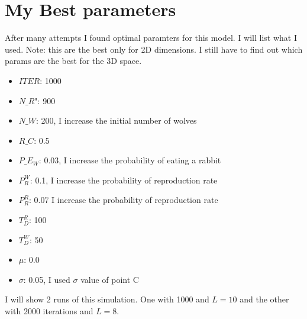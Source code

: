 \documentclass[unicode,11pt,a4paper,oneside,numbers=endperiod,openany]{scrartcl}
\begin{document}
\section*{My Best parameters}
After many attempts I found optimal paramters for this model. I will list what I used.
Note: this are the best only for 2D dimensions. I still have to find out which params are the best for the 3D space. 
\begin{itemize}
  \item $ITER$: 1000
  \item $N\_R$": 900
  \item $N\_W$: 200, I increase the initial number of wolves
  \item $R\_C$: 0.5
  \item $P\_E_W$: 0.03, I increase the probability of eating a rabbit
  \item $P_R^W$: 0.1, I increase the probability of reproduction rate
  \item $P_R^R$: 0.07 I increase the probability of reproduction rate
  \item $T_D^R$: 100 
  \item $T_D^W$: 50
  \item $ \mu$: 0.0
  \item $\sigma$: 0.05, I used $\sigma$ value of point C
\end{itemize}
I will show 2 runs of this simulation. One with 1000 and $L=10$ and the other with 2000 iterations and $L=8$. 
\end{document}

